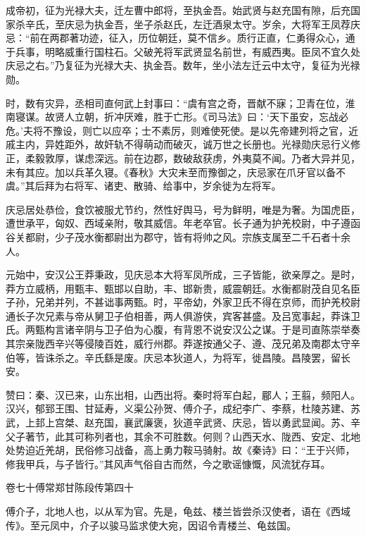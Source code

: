 \documentclass[12pt,UTF8]{ctexbook}
\begin{document}
成帝初，征为光禄大夫，迁左曹中郎将，至执金吾。始武贤与赵充国有隙，后充国家杀辛氏，至庆忌为执金吾，坐子杀赵氏，左迁酒泉太守。岁余，大将军王凤荐庆忌：“前在两郡著功迹，征入，历位朝廷，莫不信乡。质行正直，仁勇得众心，通于兵事，明略威重行国柱石。父破羌将军武贤显名前世，有威西夷。臣凤不宜久处庆忌之右。”乃复征为光禄大夫、执金吾。数年，坐小法左迁云中太守，复征为光禄勋。



时，数有灾异，丞相司直何武上封事曰：“虞有宫之奇，晋献不寐；卫青在位，淮南寝谋。故贤人立朝，折冲厌难，胜于亡形。《司马法》曰：‘天下虽安，忘战必危。’夫将不豫设，则亡以应卒；士不素厉，则难使死使。是以先帝建列将之官，近戚主内，异姓距外，故奸轨不得萌动而破灭，诚万世之长册也。光禄勋庆忌行义修正，柔毅敦厚，谋虑深远。前在边郡，数破敌获虏，外夷莫不闻。乃者大异并见，未有其应。加以兵革久寝。《春秋》大灾未至而豫御之，庆忌家在爪牙官以备不虞。”其后拜为右将军、诸吏、散骑、给事中，岁余徙为左将军。



庆忌居处恭俭，食饮被服尤节约，然性好舆马，号为鲜明，唯是为奢。为国虎臣，遭世承平，匈奴、西域亲附，敬其威信。年老卒官。长子通为护羌校尉，中子遵函谷关都尉，少子茂水衡都尉出为郡守，皆有将帅之风。宗族支属至二千石者十余人。



元始中，安汉公王莽秉政，见庆忌本大将军凤所成，三子皆能，欲亲厚之。是时，莽方立威柄，用甄丰、甄邯以自助，丰、邯新贵，威震朝廷。水衡都尉茂自见名臣子孙，兄弟并列，不甚诎事两甄。时，平帝幼，外家卫氏不得在京师，而护羌校尉通长子次兄素与帝从舅卫子伯相善，两人俱游侠，宾客甚盛。及吕宽事起，莽诛卫氏。两甄构言诸辛阴与卫子伯为心腹，有背恩不说安汉公之谋。于是司直陈崇举奏其宗亲陇西辛兴等侵陵百姓，威行州郡。莽遂按通父子、遵、茂兄弟及南郡太守辛伯等，皆诛杀之。辛氏繇是废。庆忌本狄道人，为将军，徙昌陵。昌陵罢，留长安。



赞曰：秦、汉已来，山东出相，山西出将。秦时将军白起，郿人；王翦，频阳人。汉兴，郁郅王围、甘延寿，义渠公孙贺、傅介子，成纪李广、李蔡，杜陵苏建、苏武，上邽上宫桀、赵充国，襄武廉褒，狄道辛武贤、庆忌，皆以勇武显闻。苏、辛父子著节，此其可称列者也，其余不可胜数。何则？山西天水、陇西、安定、北地处势迫近羌胡，民俗修习战备，高上勇力鞍马骑射。故《秦诗》曰：“王于兴师，修我甲兵，与子皆行。”其风声气俗自古而然，今之歌谣慷慨，风流犹存耳。





卷七十傅常郑甘陈段传第四十



傅介子，北地人也，以从军为官。先是，龟兹、楼兰皆尝杀汉使者，语在《西域传》。至元凤中，介子以骏马监求使大宛，因诏令青楼兰、龟兹国。
\end{document}
